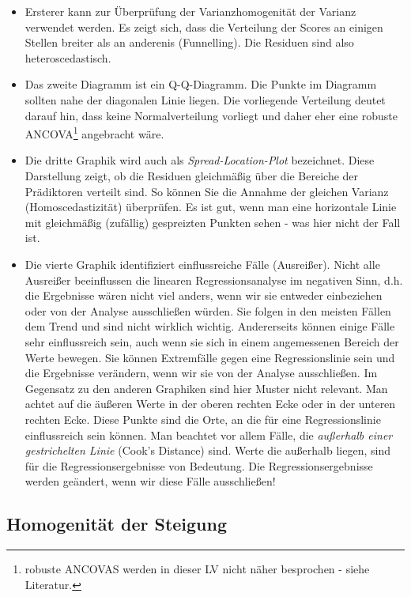 \documentclass[]{article}
\providecommand{\tightlist}{%
  \setlength{\itemsep}{0pt}\setlength{\parskip}{0pt}}
\let\rmarkdownfootnote\footnote%
\def\footnote{\protect\rmarkdownfootnote}
\begin{document}
\begin{itemize}
\tightlist
\item
  Ersterer kann zur Überprüfung der Varianzhomogenität der Varianz
  verwendet werden. Es zeigt sich, dass die Verteilung der Scores an
  einigen Stellen breiter als an anderenis (Funnelling). Die Residuen
  sind also heteroscedastisch.
\item
  Das zweite Diagramm ist ein Q-Q-Diagramm. Die Punkte im Diagramm
  sollten nahe der diagonalen Linie liegen. Die vorliegende Verteilung
  deutet darauf hin, dass keine Normalverteilung vorliegt und daher eher
  eine robuste ANCOVA\footnote{robuste ANCOVAS werden in dieser LV nicht
    näher besprochen - siehe Literatur.} angebracht wäre.
\item
  Die dritte Graphik wird auch als \emph{Spread-Location-Plot}
  bezeichnet. Diese Darstellung zeigt, ob die Residuen gleichmäßig über
  die Bereiche der Prädiktoren verteilt sind. So können Sie die Annahme
  der gleichen Varianz (Homoscedastizität) überprüfen. Es ist gut, wenn
  man eine horizontale Linie mit gleichmäßig (zufällig) gespreizten
  Punkten sehen - was hier nicht der Fall ist.
\item
  Die vierte Graphik identifiziert einflussreiche Fälle (Ausreißer).
  Nicht alle Ausreißer beeinflussen die linearen Regressionsanalyse im
  negativen Sinn, d.h. die Ergebnisse wären nicht viel anders, wenn wir
  sie entweder einbeziehen oder von der Analyse ausschließen würden. Sie
  folgen in den meisten Fällen dem Trend und sind nicht wirklich
  wichtig. Andererseits können einige Fälle sehr einflussreich sein,
  auch wenn sie sich in einem angemessenen Bereich der Werte bewegen.
  Sie können Extremfälle gegen eine Regressionslinie sein und die
  Ergebnisse verändern, wenn wir sie von der Analyse ausschließen. Im
  Gegensatz zu den anderen Graphiken sind hier Muster nicht relevant.
  Man achtet auf die äußeren Werte in der oberen rechten Ecke oder in
  der unteren rechten Ecke. Diese Punkte sind die Orte, an die für eine
  Regressionslinie einflussreich sein können. Man beachtet vor allem
  Fälle, die \emph{außerhalb einer gestrichelten Linie} (Cook's
  Distance) sind. Werte die außerhalb liegen, sind für die
  Regressionsergebnisse von Bedeutung. Die Regressionsergebnisse werden
  geändert, wenn wir diese Fälle ausschließen!
\end{itemize}

\subsection*{Homogenität der Steigung}\label{homogenitat-der-steigung}
\end{document}

